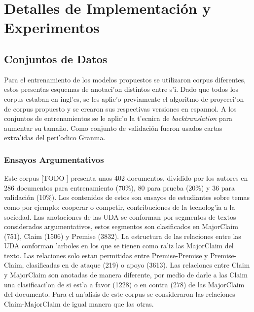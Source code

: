 \chapter{Detalles de Implementación y Experimentos}\label{chapter:implementation}


\section{Conjuntos de Datos}

Para el entrenamiento de los modelos propuestos se utilizaron corpus diferentes, estos
presentas esquemas de anotaci'on distintos entre s'i. Dado que todos los corpus estaban en ingl'es, 
se les aplic'o previamente el algoritmo de proyecci'on de corpus propuesto y se crearon sus respectivas
versiones en espannol. A los conjuntos de entrenamientos se le aplic'o la t'ecnica de \emph{backtranslation}
para aumentar su tamaño. Como conjunto de validación fueron usados cartas extra'idas del peri'odico Granma.

\subsection{Ensayos Argumentativos}\label{corpus:persuasive_essays}

Este corpus [TODO \cite{CORPUS PAPER}] presenta unos 402 documentos, dividido por los autores en 286 documentos para entrenamiento (70\%), 
80 para prueba (20\%) y 36 para validación (10\%). Los contenidos de estos son ensayos de estudiantes sobre temas
como por ejemplo: cooperar o competir, contribuciones de la tecnolog'ia a la sociedad.
Las anotaciones de las UDA se conforman por segmentos 
de textos considerados argumentativos, estos segmentos son clasificados en MajorClaim (751), Claim (1506) y Premise (3832).
La estructura de las relaciones entre las UDA conforman 'arboles en los que se tienen como ra'iz las 
MajorClaim del texto. Las relaciones solo estan permitidas entre Premise-Premise y Premise-Claim, clasificadas
en de ataque (219) o apoyo (3613). Las relaciones entre Claim y MajorClaim son anotadas de manera diferente, por medio de 
darle a las Claim una clasificaci'on de si est'a a favor (1228) o en contra (278) de las MajorClaim del documento.
Para el an'alisis de este corpus se consideraron las relaciones Claim-MajorClaim de igual manera que las otras.

